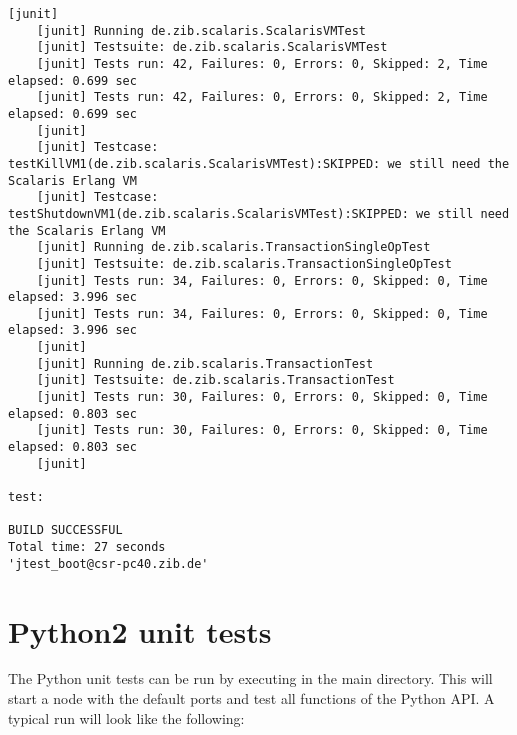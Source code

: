 \begin{lstlisting}[language={}]
    [junit] 
    [junit] Running de.zib.scalaris.ScalarisVMTest
    [junit] Testsuite: de.zib.scalaris.ScalarisVMTest
    [junit] Tests run: 42, Failures: 0, Errors: 0, Skipped: 2, Time elapsed: 0.699 sec
    [junit] Tests run: 42, Failures: 0, Errors: 0, Skipped: 2, Time elapsed: 0.699 sec
    [junit] 
    [junit] Testcase: testKillVM1(de.zib.scalaris.ScalarisVMTest):SKIPPED: we still need the Scalaris Erlang VM
    [junit] Testcase: testShutdownVM1(de.zib.scalaris.ScalarisVMTest):SKIPPED: we still need the Scalaris Erlang VM
    [junit] Running de.zib.scalaris.TransactionSingleOpTest
    [junit] Testsuite: de.zib.scalaris.TransactionSingleOpTest
    [junit] Tests run: 34, Failures: 0, Errors: 0, Skipped: 0, Time elapsed: 3.996 sec
    [junit] Tests run: 34, Failures: 0, Errors: 0, Skipped: 0, Time elapsed: 3.996 sec
    [junit] 
    [junit] Running de.zib.scalaris.TransactionTest
    [junit] Testsuite: de.zib.scalaris.TransactionTest
    [junit] Tests run: 30, Failures: 0, Errors: 0, Skipped: 0, Time elapsed: 0.803 sec
    [junit] Tests run: 30, Failures: 0, Errors: 0, Skipped: 0, Time elapsed: 0.803 sec
    [junit] 

test:

BUILD SUCCESSFUL
Total time: 27 seconds
'jtest_boot@csr-pc40.zib.de'
\end{lstlisting}

\section{Python2 unit tests}
The Python unit tests can be run by executing  in the
main directory. This will start a \scalaris{} node with the default ports and test
all functions of the Python API. A typical run will look like the
following:

